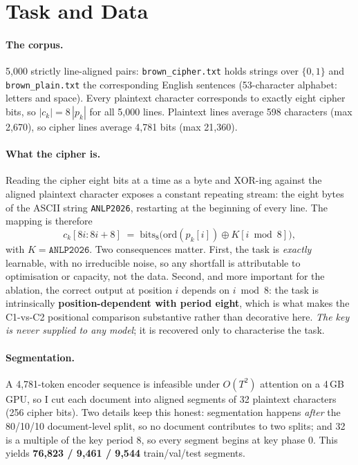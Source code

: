 \documentclass[12pt,a4paper]{article}
\begin{document}
\section{Task and Data}
\label{sec:data}

\paragraph{The corpus.} 5{,}000 strictly line-aligned pairs:
\texttt{brown\_cipher.txt} holds strings over $\{0,1\}$ and
\texttt{brown\_plain.txt} the corresponding English sentences (53-character
alphabet: letters and space). Every plaintext character corresponds to exactly
eight cipher bits, so $|c_k| = 8\,|p_k|$ for all 5{,}000 lines. Plaintext lines
average 598 characters (max 2{,}670), so cipher lines average 4{,}781 bits
(max 21{,}360).

\paragraph{What the cipher is.} Reading the cipher eight bits at a time as a
byte and XOR-ing against the aligned plaintext character exposes a constant
repeating stream: the eight bytes of the ASCII string \texttt{ANLP2026},
restarting at the beginning of every line. The mapping is therefore
\begin{equation}
c_k[8i:8i{+}8] \;=\; \mathrm{bits}_8\!\big(\mathrm{ord}(p_k[i]) \oplus K[i \bmod 8]\big),
\label{eq:cipher}
\end{equation}
with $K = \texttt{ANLP2026}$. Two consequences matter. First, the task is
\emph{exactly} learnable, with no irreducible noise, so any shortfall is
attributable to optimisation or capacity, not the data. Second, and more
important for the ablation, the correct output at position $i$ depends on
$i \bmod 8$: the task is intrinsically \textbf{position-dependent with period
eight}, which is what makes the C1-vs-C2 positional comparison substantive rather
than decorative here. \emph{The key is never supplied to any model}; it is
recovered only to characterise the task.

\paragraph{Segmentation.} A 4{,}781-token encoder sequence is infeasible under
$O(T^2)$ attention on a 4\,GB GPU, so I cut each document into aligned segments
of 32 plaintext characters (256 cipher bits). Two details keep this honest:
segmentation happens \emph{after} the 80/10/10 document-level split, so no
document contributes to two splits; and 32 is a multiple of the key period 8, so
every segment begins at key phase 0. This yields \textbf{76{,}823 / 9{,}461 /
9{,}544} train/val/test segments.
\end{document}
